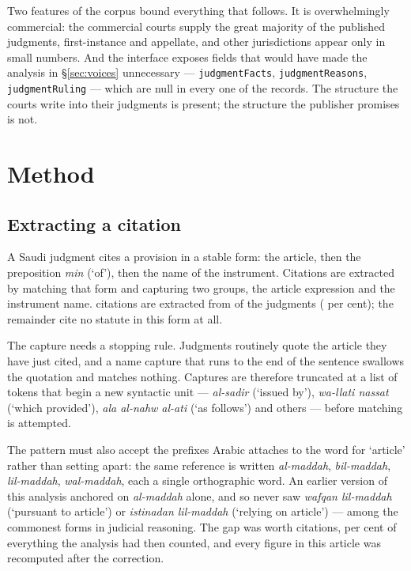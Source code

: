 \documentclass[11pt]{article}
\begin{document}
Two features of the corpus bound everything that follows. It is
overwhelmingly commercial: the commercial courts supply the great majority of
the published judgments, first-instance and appellate, and other jurisdictions
appear only in small numbers. And the interface exposes fields that would have
made the analysis in §\ref{sec:voices} unnecessary --- \texttt{judgmentFacts},
\texttt{judgmentReasons}, \texttt{judgmentRuling} --- which are null in every
one of the \nJudgments{} records. The structure the courts write into their
judgments is present; the structure the publisher promises is not.

\section{Method}
\label{sec:method}

\subsection{Extracting a citation}
\label{sec:extraction}

A Saudi judgment cites a provision in a stable form: the article, then the
preposition \emph{min} (`of'), then the name of the instrument. Citations are extracted by matching
that form and capturing two groups, the article expression and the instrument
name. \nCitations{} citations are extracted from \nJudgmentsCiting{} of the
\nJudgments{} judgments (\nJudgmentsCitingShare{} per cent); the remainder
cite no statute in this form at all.

The capture needs a stopping rule. Judgments routinely quote the article they
have just cited, and a name capture that runs to the end of the sentence
swallows the quotation and matches nothing. Captures are therefore truncated
at a list of tokens that begin a new syntactic unit --- \emph{al-sadir}
(`issued by'), \emph{wa-llati nassat} (`which provided'), \emph{ala al-nahw
al-ati} (`as follows') and others --- before matching is attempted.

The pattern must also accept the prefixes Arabic attaches to the word for
`article' rather than setting apart: the same reference is written
\emph{al-maddah}, \emph{bil-maddah}, \emph{lil-maddah}, \emph{wal-maddah},
each a single orthographic word. An earlier version of this analysis anchored
on \emph{al-maddah} alone, and so never saw \emph{wafqan lil-maddah}
(`pursuant to article') or \emph{istinadan lil-maddah} (`relying on
article') --- among the commonest forms in judicial reasoning. The gap was
worth \nPrefixGap{} citations, \nPrefixGapShare{} per cent of everything the
analysis had then counted, and every figure in this article was recomputed
after the correction.
\end{document}

